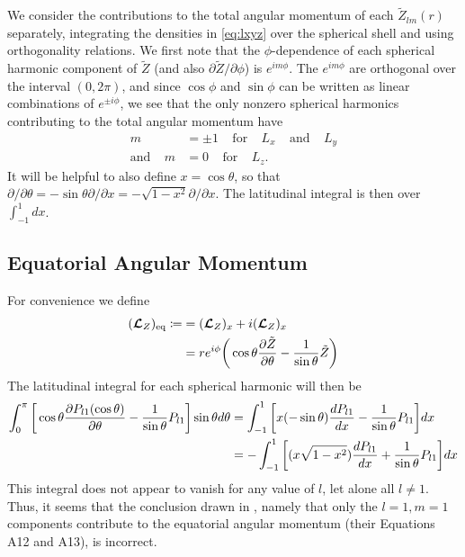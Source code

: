\documentclass[12pt]{article} %
\newcommand{\pderiv}[2]{\frac{\partial#1}{\partial#2}}
\newcommand{\andd}{\text{and}\ \ \ \ \ }
\newcommand{\tz}{\tilde{Z}}
\newcommand{\five}{\ \ \ \ \ }
\begin{document}
We consider the contributions to the total angular momentum of each $\tz_{lm}(r)$ separately, integrating the densities in \eqref{eq:lxyz} over the spherical shell and using orthogonality relations. We first note that the $\phi$-dependence of each spherical harmonic component of $\tz$ (and also $\partial\tz/\partial\phi$) is $e^{im\phi}$. The $e^{im\phi}$ are orthogonal over the interval $(0,2\pi)$, and since $\cos\phi$ and $\sin\phi$ can be written as linear combinations of $e^{\pm i\phi}$, we see that the only nonzero spherical harmonics contributing to the total angular momentum have 
\begin{align}
m&=\pm 1 \five\text{for}\five L_x\five\andd L_y\\
\andd m&=0 \five\text{for}\five L_z. 
\end{align}
It will be helpful to also define $x=\cos\theta$, so that $\partial/\partial\theta = -\sin\theta\partial/\partial x = -\sqrt{1-x^2}\partial/\partial x$. The latitudinal integral is then over $\int_{-1}^1 dx$.
\subsection{Equatorial Angular Momentum}
For convenience we define 
\begin{align}
(\bm{\mathcal{L}}_Z)_{\rm{eq}} \coloneqq &= (\bm{\mathcal{L}}_Z)_x + i(\bm{\mathcal{L}}_Z)_x\nonumber\\
	&= re^{i\phi}\bigg{(}\cos\theta\pderiv{\tz}{\theta} - \frac{1}{\sin\theta}\tz\bigg{)}
\end{align}
The latitudinal integral for each spherical harmonic will then be
\begin{align*}
\int_0^\pi \bigg{[} \cos\theta\pderiv{P_{l1}(\cos\theta)}{\theta} - \frac{1}{\sin\theta}P_{l1}\bigg{]}\sin\theta d\theta&= \int_{-1}^1 \bigg{[}x (-\sin\theta)\frac{dP_{l1}}{dx} - \frac{1}{\sin\theta}P_{l1}\bigg{]}dx\\
&= -\int_{-1}^1\bigg{[}(x\sqrt{1-x^2})\frac{dP_{l1}}{dx}  +  \frac{1}{\sin\theta}P_{l1}\bigg{]}dx
\end{align*}
This integral does not appear to vanish for any value of $l$, let alone all $l\neq 1$. Thus, it seems that the conclusion drawn in \citet{Jones11}, namely that only the $l=1, m=1$ components contribute to the equatorial angular momentum (their Equations A12 and A13), is incorrect.
\end{document}
